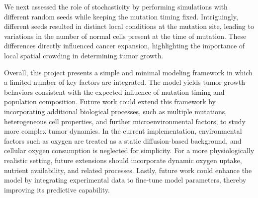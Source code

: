 \documentclass[11pt,a4paper,twoside]{article}
\begin{document}
We next assessed the role of stochasticity by performing simulations with different random seeds while keeping the mutation
timing fixed. Intriguingly, different seeds resulted in distinct local conditions at the mutation site, leading to variations
in the number of normal cells present at the time of mutation. These differences directly influenced cancer expansion, 
highlighting the importance of local spatial crowding in determining tumor growth.

Overall, this project presents a simple and minimal modeling framework in which a limited number of key factors are integrated. 
The model yields tumor growth behaviors consistent with the expected influence of mutation timing and population composition. 
Future work could extend this framework by incorporating additional biological processes, such as multiple mutations, heterogeneous
 cell properties, and further microenvironmental factors, to study more complex tumor dynamics. In the current implementation, 
environmental factors such as oxygen are treated as a static diffusion-based background, and cellular oxygen consumption is
neglected for simplicity. For a more physiologically realistic setting, future extensions should incorporate dynamic oxygen uptake, 
nutrient availability, and related processes. Lastly, future work could enhance the model by integrating experimental data to fine-tune
model parameters, thereby improving its predictive capability.

\printbibliography
\end{document}
